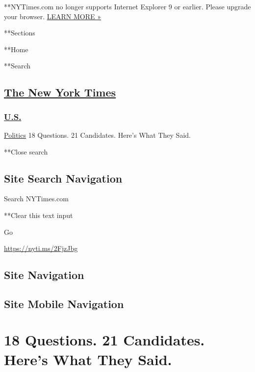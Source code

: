  **NYTimes.com no longer supports Internet Explorer 9 or earlier. Please
upgrade your browser.
\href{http://www.nytimes.com/content/help/site/ie9-support.html}{LEARN
MORE »}

**Sections

**Home

**Search

\hypertarget{the-new-york-times}{%
\subsection{\texorpdfstring{\href{http://www.nytimes.com/}{The New York
Times}}{The New York Times}}\label{the-new-york-times}}

\hypertarget{-us-}{%
\subsubsection{\texorpdfstring{
\href{https://www.nytimes.com/section/us}{U.S.} }{ U.S. }}\label{-us-}}

 \href{/section/politics}{Politics} \textbar{}18 Questions. 21
Candidates. Here's What They Said.

**Close search

\hypertarget{site-search-navigation}{%
\subsection{Site Search Navigation}\label{site-search-navigation}}

Search NYTimes.com

**Clear this text input

Go

\url{https://nyti.ms/2FjzJbg}

\hypertarget{site-navigation}{%
\subsection{Site Navigation}\label{site-navigation}}

\hypertarget{site-mobile-navigation}{%
\subsection{Site Mobile Navigation}\label{site-mobile-navigation}}

\hypertarget{18-questions-21-candidates-heres-what-they-said}{%
\section{18 Questions. 21 Candidates. Here's What They
Said.}\label{18-questions-21-candidates-heres-what-they-said}}

